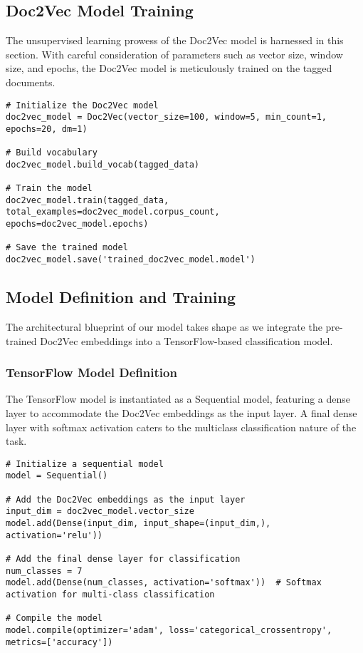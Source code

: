 \subsection{Doc2Vec Model Training}
The unsupervised learning prowess of the Doc2Vec model is harnessed in this section. With careful consideration of parameters such as vector size, window size, and epochs, the Doc2Vec model is meticulously trained on the tagged documents.

\begin{lstlisting}
# Initialize the Doc2Vec model
doc2vec_model = Doc2Vec(vector_size=100, window=5, min_count=1, epochs=20, dm=1)

# Build vocabulary
doc2vec_model.build_vocab(tagged_data)

# Train the model
doc2vec_model.train(tagged_data, total_examples=doc2vec_model.corpus_count, epochs=doc2vec_model.epochs)

# Save the trained model
doc2vec_model.save('trained_doc2vec_model.model')
\end{lstlisting}

\subsection{Model Definition and Training}
The architectural blueprint of our model takes shape as we integrate the pre-trained Doc2Vec embeddings into a TensorFlow-based classification model.

\subsubsection{TensorFlow Model Definition}
The TensorFlow model is instantiated as a Sequential model, featuring a dense layer to accommodate the Doc2Vec embeddings as the input layer. A final dense layer with softmax activation caters to the multiclass classification nature of the task.

\begin{lstlisting}
# Initialize a sequential model
model = Sequential()

# Add the Doc2Vec embeddings as the input layer
input_dim = doc2vec_model.vector_size
model.add(Dense(input_dim, input_shape=(input_dim,), activation='relu'))

# Add the final dense layer for classification
num_classes = 7
model.add(Dense(num_classes, activation='softmax'))  # Softmax activation for multi-class classification

# Compile the model
model.compile(optimizer='adam', loss='categorical_crossentropy', metrics=['accuracy'])
\end{lstlisting}

